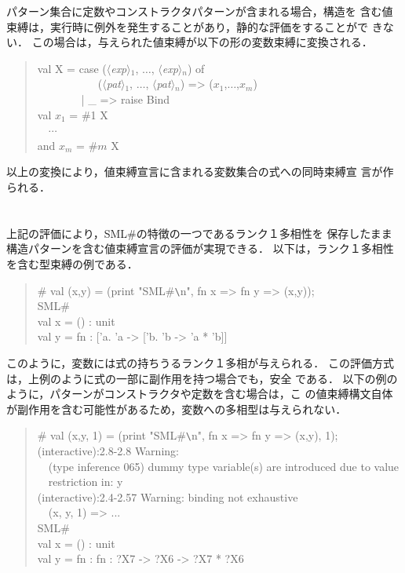\documentclass{jbook}
\newif\ifjp
\newcommand{\txt}[2]{#2}
\newcommand{\smlsharp}{SML\#}
\newcommand{\nonterm}[1]{\mbox{$\langle$}{\it #1}\mbox{$\rangle$}}
\newcommand{\myem}{\mbox{\ \ }}
\newenvironment{program}{\begin{quote}\begin{tt}}%
                        {\end{tt}\end{quote}}
\begin{document}
	パターン集合に定数やコンストラクタパターンが含まれる場合，構造を
含む値束縛は，実行時に例外を発生することがあり，静的な評価をすることがで
きない．
	この場合は，与えられた値束縛が以下の形の変数束縛に変換される．
\begin{program}
  val X = case (\nonterm{exp}$_1$, $\ldots$, \nonterm{exp}$_n$) of\\
  \myem\myem\myem\myem\ \ \ (\nonterm{pat}$_1$, $\ldots$, \nonterm{pat}$_n$) => ($x_1$,$\ldots$,$x_m$)\\
  \myem\myem\myem\myem | \_ => raise Bind\\
  val $x_1$ = \#1 X\\
  \myem $\cdots$\\
  and $x_m$ = \#$m$ X
\end{program}

	以上の変換により，値束縛宣言に含まれる変数集合の式への同時束縛宣
言が作られる．

\else%
\fi%

\section{\txt{値束縛宣言とインタフェイス宣言の例}{}}
\label{sec:valuBindings:examples}
\ifjp%

	上記の評価により，\smlsharp{}の特徴の一つであるランク１多相性を
保存したまま構造パターンを含む値束縛宣言の評価が実現できる．
	以下は，ランク１多相性を含む型束縛の例である．
\begin{program}
  \# val (x,y) = (print "SML\#\verb|\|n", fn x => fn y => (x,y));\\
  SML\#\\
  val x = () : unit\\
  val y = fn : ['a. 'a -> ['b. 'b -> 'a * 'b]]
\end{program}
	このように，変数には式の持ちうるランク１多相が与えられる．
	この評価方式は，上例のように式の一部に副作用を持つ場合でも，安全
である．
	以下の例のように，パターンがコンストラクタや定数を含む場合は，こ
の値束縛構文自体が副作用を含む可能性があるため，変数への多相型は与えられない．
\begin{program}
  \# val (x,y, 1) = (print "SML\#\verb|\|n", fn x => fn y => (x,y), 1);\\
  (interactive):2.8-2.8 Warning:\\
  \myem (type inference 065) dummy type variable(s) are introduced due to value\\
  \myem restriction in: y\\
  (interactive):2.4-2.57 Warning: binding not exhaustive\\
  \myem  (x, y, 1) => ...\\
  SML\#\\
  val x = () : unit\\
  val y = fn : fn : ?X7 -> ?X6 -> ?X7 * ?X6
\end{program}
\end{document}
